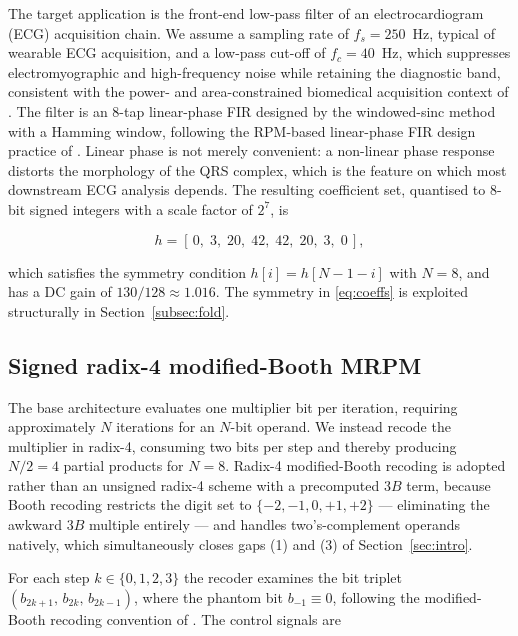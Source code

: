 \documentclass[conference]{IEEEtran}
\begin{document}
The target application is the front-end low-pass filter of an
electrocardiogram (ECG) acquisition chain. We assume a sampling rate of
$f_s = 250$~Hz, typical of wearable ECG acquisition, and a low-pass
cut-off of $f_c = 40$~Hz, which suppresses electromyographic and
high-frequency noise while retaining the diagnostic band, consistent
with the power- and area-constrained biomedical acquisition context of
\cite{lotfabadi,ajay}. The filter is
an 8-tap linear-phase FIR designed by the windowed-sinc method with a
Hamming window, following the RPM-based linear-phase FIR design practice
of \cite{gunasekaran}. Linear phase is not merely convenient: a non-linear
phase response distorts the morphology of the QRS complex, which is the
feature on which most downstream ECG analysis depends. The resulting
coefficient set, quantised to 8-bit signed integers with a scale factor
of $2^7$, is

\begin{equation}
h = [\,0,\; 3,\; 20,\; 42,\; 42,\; 20,\; 3,\; 0\,],
\label{eq:coeffs}
\end{equation}

\noindent which satisfies the symmetry condition $h[i] = h[N-1-i]$ with
$N = 8$, and has a DC gain of $130/128 \approx 1.016$. The symmetry in
\eqref{eq:coeffs} is exploited structurally in
Section~\ref{subsec:fold}.

\subsection{Signed radix-4 modified-Booth MRPM}
\label{subsec:mult}

The base architecture \cite{base} evaluates one multiplier bit per
iteration, requiring approximately $N$ iterations for an $N$-bit
operand. We instead recode the multiplier in radix-4, consuming two
bits per step and thereby producing $N/2 = 4$ partial products for
$N = 8$. Radix-4 modified-Booth recoding is adopted rather than an
unsigned radix-4 scheme with a precomputed $3B$ term, because Booth
recoding restricts the digit set to $\{-2,-1,0,+1,+2\}$ --- eliminating
the awkward $3B$ multiple entirely --- and handles two's-complement
operands natively, which simultaneously closes gaps (1) and (3) of
Section~\ref{sec:intro}.

For each step $k \in \{0,1,2,3\}$ the recoder examines the bit triplet
$(b_{2k+1},\, b_{2k},\, b_{2k-1})$, where the phantom bit
$b_{-1} \equiv 0$, following the modified-Booth recoding convention of
\cite{prabhu}. The control signals are
\end{document}
